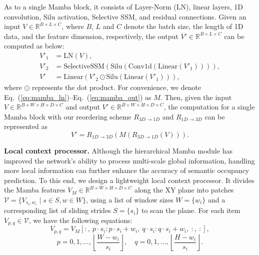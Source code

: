 \documentclass[10pt,twocolumn,letterpaper]{article}
\begin{document}
As to a single Mamba block, it consists of Layer-Norm (LN), linear layers, 1D convolution, Silu activation, Selective SSM, and residual connections. Given an input $V \in \mathbb{R}^{B \times L \times C}$, where $B$, $L$ and $C$ denote the batch size, the length of 1D data, and the feature dimension, respectively, the output $V' \in \mathbb{R}^{B \times L \times C}$ can be computed as below:
\begin{align}
  V'_1 &= \text{LN}(V), \label{eq:mamba_ln} \\
  V'_2 &= \text{SelectiveSSM}(\text{Silu}(\text{Conv1d}(\text{Linear}(V'_1)))), \label{eq:mamba_ssm} \\
  V'   &= \text{Linear}(V'_2 \odot \text{Silu}(\text{Linear}(V'_1))), \label{eq:mamba_out}
\end{align}
where $\odot$ represents the dot product. For convenience, we denote Eq.~(\ref{eq:mamba_ln})--Eq.~(\ref{eq:mamba_out}) as $M$. Then, given the input $V \in \mathbb{R}^{B \times W \times H \times D \times C}$ and output $V' \in \mathbb{R}^{B \times W \times H \times D \times C}$, the computation for a single Mamba block with our reordering scheme $R_{3D \to 1D}$ and $R_{1D \to 3D}$ can be represented as
\begin{equation}
  V' = R_{1D \to 3D}\!\left(M(R_{3D \to 1D}(V))\right). \label{eq:single_mamba}
\end{equation}

\textbf{Local context processor.}
Although the hierarchical Mamba module has improved the network's ability to process multi-scale global information, handling more local information can further enhance the accuracy of semantic occupancy prediction. To this end, we design a lightweight local context processor. It divides the Mamba features $V_M \in \mathbb{R}^{B \times W \times H \times D \times C}$ along the XY plane into patches $\mathcal{V} = \{V_{s_i, w_i} \mid s \in S, w \in W\}$, using a list of window sizes $W = \{w_i\}$ and a corresponding list of sliding strides $S = \{s_i\}$ to scan the plane. For each item $V_{p,q} \in \mathcal{V}$, we have the following equations:
\begin{equation}
  V_{p,q} = V_M[:,\ p\!\cdot\!s_i : p\!\cdot\!s_i\!+\!w_i,\ q\!\cdot\!s_i : q\!\cdot\!s_i\!+\!w_i,\ :,\ :],
  \label{eq:lcp_window}
\end{equation}
\[
  p = 0,1,\ldots,\left\lfloor\frac{W - w_i}{s_i}\right\rfloor,\quad
  q = 0,1,\ldots,\left\lfloor\frac{H - w_i}{s_i}\right\rfloor.
\]
\end{document}
